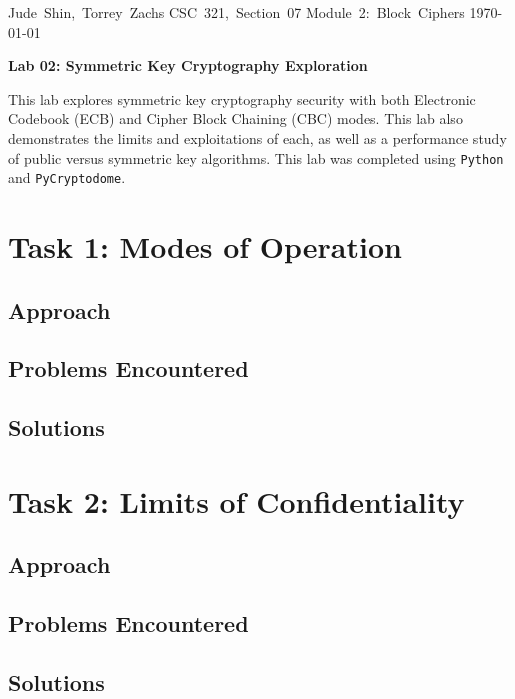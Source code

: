 \documentclass[11pt]{article}
\begin{document}
\hfill\vbox{\hbox{Jude Shin, Torrey Zachs}
		\hbox{CSC 321, Section 07}	
		\hbox{Module 2: Block Ciphers}	
		\hbox{\today}}\par

\bigskip
\centerline{\Large\bf Lab 02: Symmetric Key Cryptography Exploration}\par
\bigskip

This lab explores symmetric key cryptography security with both Electronic Codebook (ECB) and Cipher Block Chaining (CBC) modes. This lab also demonstrates the limits and exploitations of each, as well as a performance study of public versus symmetric key algorithms. This lab was completed using {\tt Python} and {\tt PyCryptodome}.

\section*{Task 1: Modes of Operation}
\subsection*{Approach}
\subsection*{Problems Encountered}
\subsection*{Solutions}

\section*{Task 2: Limits of Confidentiality}
\subsection*{Approach}
\subsection*{Problems Encountered}
\subsection*{Solutions}
\end{document}
